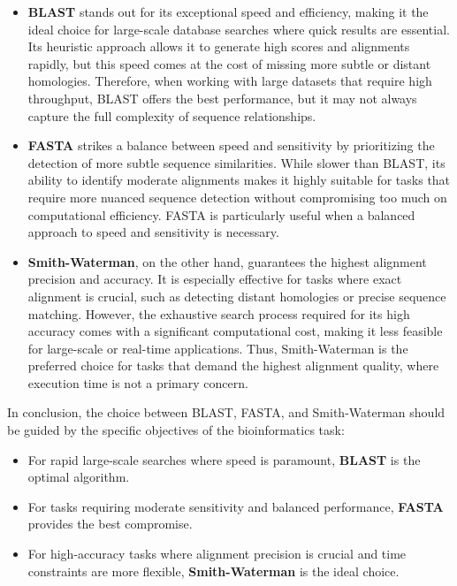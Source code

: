 \documentclass{article}
\begin{document}
\begin{itemize}
    \item \textbf{BLAST} stands out for its exceptional speed and efficiency, making it the ideal choice for large-scale database searches where quick results are essential. Its heuristic approach allows it to generate high scores and alignments rapidly, but this speed comes at the cost of missing more subtle or distant homologies. Therefore, when working with large datasets that require high throughput, BLAST offers the best performance, but it may not always capture the full complexity of sequence relationships.
    \item \textbf{FASTA} strikes a balance between speed and sensitivity by prioritizing the detection of more subtle sequence similarities. While slower than BLAST, its ability to identify moderate alignments makes it highly suitable for tasks that require more nuanced sequence detection without compromising too much on computational efficiency. FASTA is particularly useful when a balanced approach to speed and sensitivity is necessary.
    \item \textbf{Smith-Waterman}, on the other hand, guarantees the highest alignment precision and accuracy. It is especially effective for tasks where exact alignment is crucial, such as detecting distant homologies or precise sequence matching. However, the exhaustive search process required for its high accuracy comes with a significant computational cost, making it less feasible for large-scale or real-time applications. Thus, Smith-Waterman is the preferred choice for tasks that demand the highest alignment quality, where execution time is not a primary concern.
\end{itemize}

In conclusion, the choice between BLAST, FASTA, and Smith-Waterman should be guided by the specific objectives of the bioinformatics task:
\begin{itemize}
    \item For rapid large-scale searches where speed is paramount, \textbf{BLAST} is the optimal algorithm.
    \item For tasks requiring moderate sensitivity and balanced performance, \textbf{FASTA} provides the best compromise.
    \item For high-accuracy tasks where alignment precision is crucial and time constraints are more flexible, \textbf{Smith-Waterman} is the ideal choice.
\end{itemize}
\end{document}
